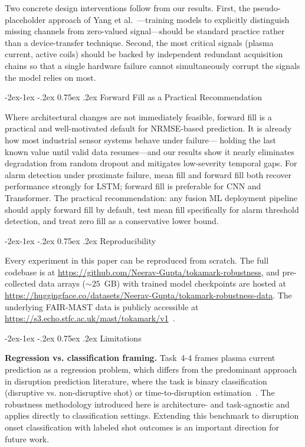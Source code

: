 \documentclass[10pt,twocolumn]{article}
\makeatletter
\renewcommand\subsection{\@startsection{subsection}{2}{\z@}%
  {-2ex\@plus -1ex \@minus -.2ex}%
  {0.75ex \@plus .2ex}%
  {\normalfont\large\bfseries}}
\makeatother
\begin{document}
Two concrete design interventions follow from our results. First, the
pseudo-placeholder approach of Yang et al.~\cite{yang2025hl3}—training
models to explicitly distinguish missing channels from zero-valued
signal—should be standard practice rather than a device-transfer
technique. Second, the most critical signals (plasma current, active
coils) should be backed by independent redundant acquisition chains so
that a single hardware failure cannot simultaneously corrupt the signals
the model relies on most.

\subsection{Forward Fill as a Practical Recommendation}

Where architectural changes are not immediately feasible, forward fill
is a practical and well-motivated default for NRMSE-based prediction.
It is already how most industrial sensor systems behave under failure—
holding the last known value until valid data resumes—and our results
show it nearly eliminates degradation from random dropout and mitigates
low-severity temporal gaps. For alarm detection under proximate failure,
mean fill and forward fill both recover performance strongly for LSTM;
forward fill is preferable for CNN and Transformer. The practical
recommendation: any fusion ML deployment pipeline should apply forward
fill by default, test mean fill specifically for alarm threshold
detection, and treat zero fill as a conservative lower bound.

\subsection{Reproducibility}

Every experiment in this paper can be reproduced from scratch. The
full codebase is at
\url{https://github.com/Neerav-Gupta/tokamark-robustness}, and
pre-collected data arrays (${\sim}25$~GB) with trained model checkpoints
are hosted at
\url{https://huggingface.co/datasets/Neerav-Gupta/tokamark-robustness-data}.
The underlying FAIR-MAST data is publicly accessible at
\url{https://s3.echo.stfc.ac.uk/mast/tokamark/v1}~\cite{jackson2024softwarex}.

\subsection{Limitations}

\textbf{Regression vs. classification framing.}
Task~4-4 frames plasma current prediction as a regression problem,
which differs from the predominant approach in disruption prediction
literature, where the task is binary classification (disruptive vs.
non-disruptive shot) or time-to-disruption estimation~\cite{rea2019,
katesharbeck2019, spangher2025, saperstein2025, ai2025}. The robustness
methodology introduced here is architecture- and task-agnostic and
applies directly to classification settings. Extending this benchmark
to disruption onset classification with labeled shot outcomes is an
important direction for future work.
\end{document}
